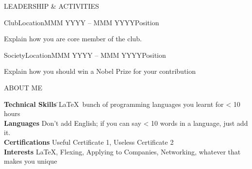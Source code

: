 \documentclass{article}
\newlength{\secsep}
\newcommand{\lineunder}{\vspace*{-8pt} \\ \hspace*{-6pt} \hrulefill \\ \vspace*{-15pt}}
\newenvironment{tabbedsection}[1]{
  \begin{list}{}{
      \setlength{\itemsep}{0pt}
      \setlength{\labelsep}{0pt}
      \setlength{\labelwidth}{0pt}
      \setlength{\leftmargin}{0pt}
      \setlength{\rightmargin}{0pt}
      \setlength{\listparindent}{0pt}
      \setlength{\parsep}{0pt}
      \setlength{\parskip}{0pt}
      \setlength{\partopsep}{0pt}
      \setlength{\topsep}{0.4pt}
    }
  \item[]
}{\end{list}}
\newenvironment{resume_section}[1]{
  \filbreak
  \vspace{2\secsep}
  \textbf{\textsc{\large#1}}
  \lineunder
  \begin{tabbedsection}{\secsep}
}{\end{tabbedsection}}
\newenvironment{subitems}{
  
  \begin{itemize}
      \setlength{\labelsep}{1em}
}{\end{itemize}}
\newenvironment{resume_employer}[4]{
  \vspace{\secsep}
  \textbf{#1}  \hfill \textbf{#2}
  \begin{flushright} \indent \emph{{\small#4}} \hfill \emph{{\small#3}} \end{flushright}
  \begin{tabbedsection}{0pt}
  \begin{subitems}
}{\end{subitems}\end{tabbedsection}}
\begin{document}
 \begin{resume_section}{LEADERSHIP \& ACTIVITIES}
    \begin{resume_employer}{Club}{Location}{MMM YYYY -- MMM YYYY}{Position}
    \item \small{Explain how you are core member of the club.}
\end{resume_employer}
 
       \begin{resume_employer}{Society}{Location}{MMM YYYY -- MMM YYYY}{Position}
    \item \small{Explain how you should win a Nobel Prize for your contribution}
\end{resume_employer}

   \end{resume_section}
  
 \begin{resume_section}{ABOUT ME}
  \begin{tabbing}
  \textbf{Technical Skills} \= \quad\small{\LaTeX\, bunch of programming languages you learnt for < 10 hours} \\
  \textbf{Languages} \> \quad\small{Don't add English; if you can say < 10 words in a language, just add it.}\\
  \textbf{Certifications} \> \quad\small{Useful Certificate 1, Useless Certificate 2}\\
  \textbf{Interests} \> \quad\small{\LaTeX, Flexing, Applying to Companies, Networking, whatever that makes you unique}\\
  \end{tabbing}

\end{resume_section}
\end{document}
